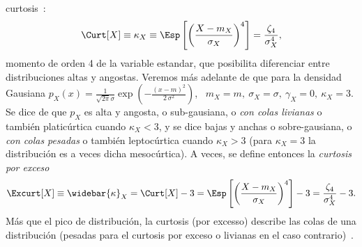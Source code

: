\begin{itemize}
\begin{enumerate}
{    curtosis}~\cite{Pea05, Wes14}:
  \[
  \Curt[X]  \equiv \kappa_X  \equiv \Esp\left[  \left( \frac{X  - m_X}{\sigma_X}
    \right)^4 \right] = \frac{\zeta_4}{\sigma_X^4},
  \]
  momento de orden  4 de la variable estandar,  que posibilita diferenciar entre
  distribuciones  altas y  angostas.   Veremos  m\'as adelante  de  que para  la
  densidad  Gausiana  $p_X(x)  =  \frac{1}{\sqrt{2  \pi}  \sigma}  \exp\left(  -
    \frac{(x-m)^2}{2 \, \sigma^2} \right)$, \ $m_X = m, \: \sigma_X = \sigma, \:
  \gamma_X =  0, \: \kappa_X  = 3$. Se  dice de que $p_X$  es alta y  angosta, o
  sub-gausiana,  o {\it con  colas livianas}  o tambi\'en  platic\'urtica cuando
  $\kappa_X < 3$,  y se dice bajas  y anchas o sobre-gausiana, o  {\it con colas
    pesadas} o tambi\'en leptoc\'urtica cuando  $\kappa_X > 3$ (para $\kappa_X =
  3$  la distribuci\'on es  a veces  dicha mesoc\'urtica).   A veces,  se define
  entonces la {\it curtosis por exceso}
  \[
  \Excurt[X]  \equiv \widebar{\kappa}_X  = \Curt[X]  - 3  =  \Esp\left[ \left(
      \frac{X     -     m_X}{\sigma_X}    \right)^4     \right]     -    3     =
  \frac{\zeta_4}{\sigma_X^4} - 3.
  \]
  M\'as que  el pico de distribuci\'on,  la curtosis (por  excesso) describe las
  colas de una distribuci\'on (pesadas para el curtosis por exceso o livianas en
  el caso contrario)~\cite{Wes14}. 
\end{enumerate}
\end{itemize}
